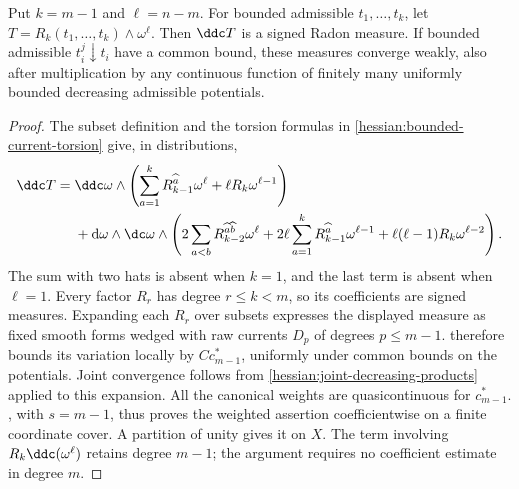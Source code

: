 
\begin{lemma}\label{draft633:bounded-torsion-weight}
Put $k=m-1$ and $\ell=n-m$. For bounded admissible
$t_1,\ldots,t_k$, let
$T=R_k(t_1,\ldots,t_k)\wedge\omega^\ell$.
Then $\ddc T$ is a signed Radon measure. If bounded admissible
$t_i^j\downarrow t_i$ have a common bound, these measures converge
weakly, also after multiplication by any continuous function of
finitely many uniformly bounded decreasing admissible potentials.
\end{lemma}
\begin{proof}
The subset definition and the torsion formulas in
\cref{hessian:bounded-current-torsion} give, in distributions,
\[
\begin{aligned}
 \ddc T={}&\ddc\omega\wedge
 \left(\sum_{a=1}^kR_{k-1}^{\widehat a}\omega^\ell
                       +\ell R_k\omega^{\ell-1}\right)\\
 &+\mathrm d\omega\wedge\dc\omega\wedge
 \left(2\sum_{a<b}R_{k-2}^{\widehat a\widehat b}\omega^\ell
       +2\ell\sum_{a=1}^kR_{k-1}^{\widehat a}\omega^{\ell-1}
       +\ell(\ell-1)R_k\omega^{\ell-2}\right).
\end{aligned}
\]
The sum with two hats is absent when $k=1$, and the last term is
absent when $\ell=1$. Every factor $R_r$ has degree $r\leq k<m$,
so its coefficients are signed measures. Expanding each $R_r$
over subsets expresses the displayed measure as fixed smooth forms
wedged with raw currents $D_p$ of degrees $p\leq m-1$.
 therefore bounds its
variation locally by $C c_{m-1}^*$, uniformly under common bounds
on the potentials. Joint convergence follows from
\cref{hessian:joint-decreasing-products} applied to this expansion.
All the canonical weights are quasicontinuous for $c_{m-1}^*$.
, with $s=m-1$,
thus proves the weighted assertion coefficientwise on a finite
coordinate cover. A partition of unity gives it on $X$.
The term involving $R_k\ddc(\omega^\ell)$ retains degree $m-1$;
the argument requires no coefficient estimate in degree $m$.
\end{proof}

